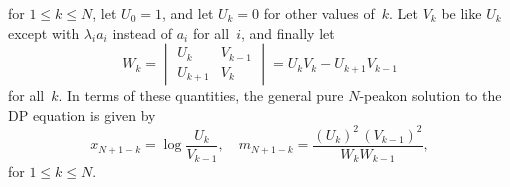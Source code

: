 \documentclass[10pt,a4paper]{article} \pdfoutput=1 
\begin{document}
for $1 \le k \le N$,
let $U_0 = 1$, and let $U_k=0$ for other values of~$k$.
Let $V_k$ be like $U_k$ except with $\lambda_i a_i$ instead of $a_i$ for all~$i$,
and finally let
\begin{equation}
  \label{eq:DP-def-Wk}
  W_k = \begin{vmatrix} U_k & V_{k-1} \\ U_{k+1} & V_k \end{vmatrix}
  = U_k V_k - U_{k+1} V_{k-1}
\end{equation}
for all~$k$.
In terms of these quantities, the general pure $N$-peakon solution to the DP equation is given by
\begin{equation}
  \label{eq:DP-n-peakon-solution}
  x_{N+1-k} = \log \frac{U_k}{V_{k-1}}
  , \quad
  m_{N+1-k} =
  \frac{(U_k)^2 \, (V_{k-1})^2}{W_k W_{k-1}}
  ,
\end{equation}
for $1 \le k \le N$.
\end{document}
